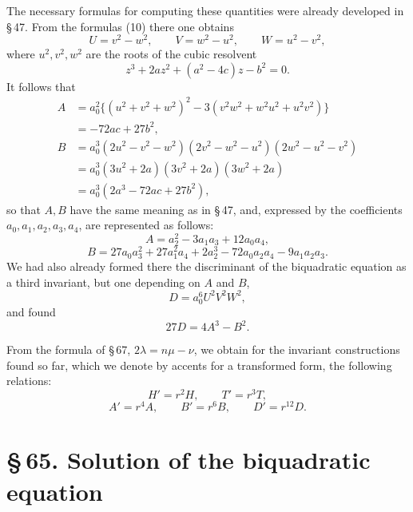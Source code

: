 \documentclass[11pt]{article}
\newcommand{\sect}[2]{\section*{\S\,#1. #2}}
\begin{document}
The necessary formulas for computing these quantities were already developed in \S\,47. From the formulas (10) there one obtains
\[
 U=v^2-w^2,
 \qquad V=w^2-u^2,
 \qquad W=u^2-v^2,
\]
where $u^2,v^2,w^2$ are the roots of the cubic resolvent
\[
 z^3+2az^2+(a^2-4c)z-b^2=0.
\]
It follows that
\[
\begin{aligned}
 A&=a_0^2\{(u^2+v^2+w^2)^2-3(v^2w^2+w^2u^2+u^2v^2)\}\\
  &=-72ac+27b^2,\\[0.4em]
 B&=a_0^3(2u^2-v^2-w^2)(2v^2-w^2-u^2)(2w^2-u^2-v^2)\\
  &=a_0^3(3u^2+2a)(3v^2+2a)(3w^2+2a)\\
  &=a_0^3(2a^3-72ac+27b^2),
\end{aligned}
\]
so that $A,B$ have the same meaning as in \S\,47, and, expressed by the coefficients $a_0,a_1,a_2,a_3,a_4$, are represented as follows:
\begin{equation}
 A=a_2^2-3a_1a_3+12a_0a_4,
\tag{8}
\end{equation}
\begin{equation}
 B=27a_0a_3^2+27a_1^2a_4+2a_2^3-72a_0a_2a_4-9a_1a_2a_3.
\tag{9}
\end{equation}
We had also already formed there the discriminant of the biquadratic equation as a third invariant, but one depending on $A$ and $B$,
\begin{equation}
 D=a_0^6U^2V^2W^2,
\tag{10}
\end{equation}
and found
\begin{equation}
 27D=4A^3-B^2.
\tag{11}
\end{equation}

From the formula of \S\,67, $2\lambda=n\mu-\nu$, we obtain for the invariant constructions found so far, which we denote by accents for a transformed form, the following relations:
\begin{equation}
 H'=r^2H,
 \qquad T'=r^3T,
\tag{12a}
\end{equation}
\begin{equation}
 A'=r^4A,
 \qquad B'=r^6B,
 \qquad D'=r^{12}D.
\tag{12b}
\end{equation}

\sect{65}{Solution of the biquadratic equation}
\end{document}
